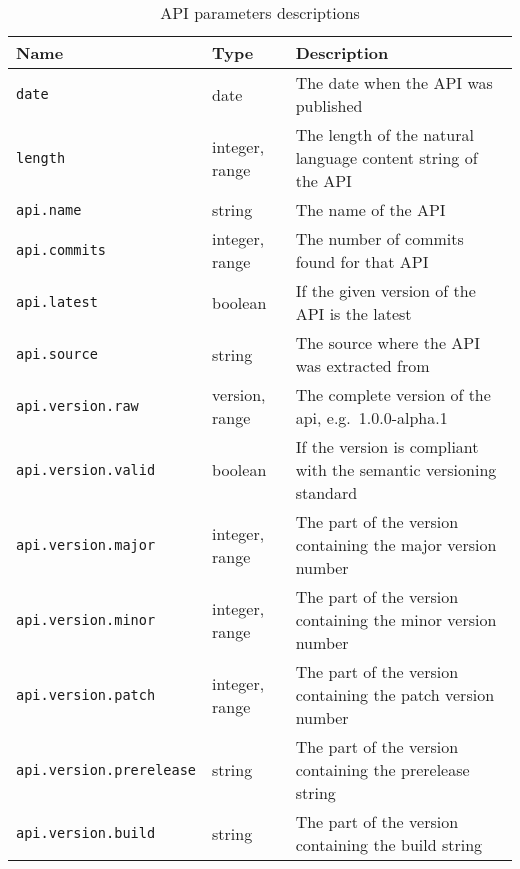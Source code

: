 \begin{table}[H]
    \begin{center}
        \begin{tabular}{l l p{9cm}}
            \hline
            \textbf{Name} & \textbf{Type} & \textbf{Description} \\ \hline
            \verb|date| & date & The date when the API was published \\
            \verb|length| & integer, range & The length of the natural language content string of the API  \\
            \verb|api.name| & string & The name of the API \\
            \verb|api.commits| & integer, range & The number of commits found for that API \\
            \verb|api.latest| & boolean & If the given version of the API is the latest \\
            \verb|api.source| & string & The source where the API was extracted from \\
            \verb|api.version.raw| & version, range & The complete version of the api, e.g.\ 1.0.0-alpha.1 \\
            \verb|api.version.valid| & boolean & If the version is compliant with the semantic versioning standard~\cite{preston-werner_semantic_nodate} \\
            \verb|api.version.major| & integer, range & The part of the version containing the major version number \\
            \verb|api.version.minor| & integer, range & The part of the version containing the minor version number \\
            \verb|api.version.patch| & integer, range & The part of the version containing the patch version number \\
            \verb|api.version.prerelease| & string & The part of the version containing the prerelease string \\
            \verb|api.version.build| & string & The part of the version containing the build string \\ \hline
        \end{tabular}
    \end{center}

    \caption{API parameters descriptions}
    \label{tab:parameters-api}
\end{table}


